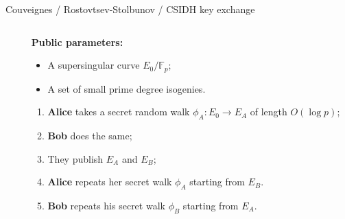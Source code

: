 \documentclass[aspectratio=169]{beamer}
\newcommand{\F}{\mathbb{F}}
\begin{document}
{\begin{frame}{Couveignes / Rostovtsev-Stolbunov / CSIDH key exchange}
\begin{columns}
\begin{column}{0.55\textwidth}
      \end{column}    
      \begin{column}{0.45\textwidth}
        \textbf{Public parameters:}
        \begin{itemize}
        \item A supersingular curve $E_0/\F_p$;
        \item A set of small prime degree isogenies.
        \end{itemize}
        \begin{enumerate}
        \item<2-> \textbf{Alice} takes a \alert{secret} random walk
          \emph{$ϕ_A:E_0\to E_A$} of length \emph{$O(\log p)$};
        \item<3-> \textbf{Bob} does the same;
        \item<4-> They publish \emph{$E_A$} and \emph{$E_B$};
        \item<5-> \textbf{Alice} repeats her secret walk \emph{$ϕ_A$}
          starting from \emph{$E_B$}.
        \item<6-> \textbf{Bob} repeats his secret walk \emph{$ϕ_B$}
          starting from \emph{$E_A$}.
        \end{enumerate}
      \end{column}
    \end{columns}
  \end{frame}
}

\end{document}
